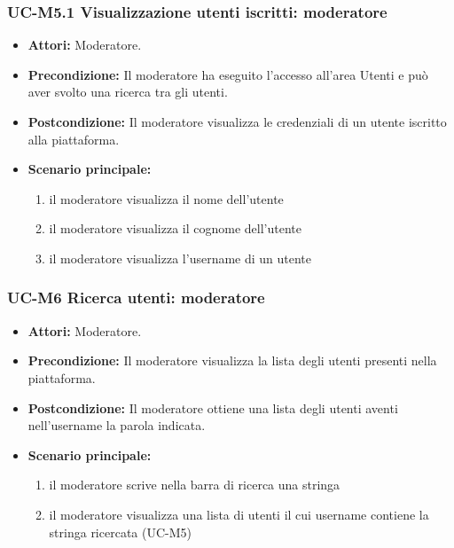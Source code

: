 \subsubsection{UC-M5.1 Visualizzazione utenti iscritti: moderatore}
	\begin{itemize}
		\item \textbf{Attori:} Moderatore.
		\item \textbf{Precondizione:} Il moderatore ha eseguito l'accesso all'area Utenti e può aver svolto una ricerca tra gli utenti.
		\item \textbf{Postcondizione:} Il moderatore visualizza le credenziali di un utente iscritto alla piattaforma.
		\item \textbf{Scenario principale:}
			\begin{enumerate}
				\item il moderatore visualizza il nome dell'utente
				\item il moderatore visualizza il cognome dell'utente
				\item il moderatore visualizza l'username di un utente
			\end{enumerate}
	\end{itemize}
		
\subsubsection{UC-M6 Ricerca utenti: moderatore}
	\begin{itemize}
		\item \textbf{Attori:} Moderatore.
		\item \textbf{Precondizione:} Il moderatore visualizza la lista degli utenti presenti nella piattaforma.
		\item \textbf{Postcondizione:} Il moderatore ottiene una lista degli utenti aventi nell'username la parola indicata.
		\item \textbf{Scenario principale:}
			\begin{enumerate}
				\item il moderatore scrive nella barra di ricerca una stringa
				\item il moderatore visualizza una lista di utenti il cui username contiene la stringa ricercata (UC-M5)
			\end{enumerate}
	\end{itemize}

